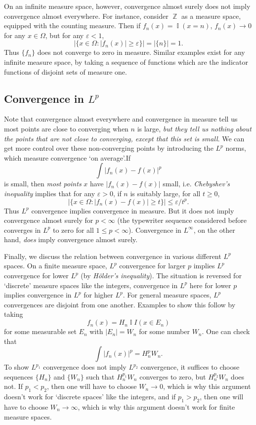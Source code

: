 \documentclass[answers]{exam}
\DeclareMathOperator{\ZZ}{\mathbb{Z}}
\DeclareMathOperator{\II}{\mathbb{I}}
\begin{document}
\begin{questions}
On an infinite measure space, however, convergence almost surely does not imply convergence almost everywhere. For instance, consider $\ZZ$ as a measure space, equipped with the counting measure. Then if $f_n(x) = \II(x = n)$, $f_n(x) \to 0$ for any $x \in \Omega$, but for any $\varepsilon < 1$,
%
\[ \Big| \{ x \in \Omega: |f_n(x)| \geq \varepsilon \} \Big| = | \{ n \} | = 1. \]
%
Thus $\{ f_n \}$ does not converge to zero in measure. Similar examples exist for any infinite measure space, by taking a sequence of functions which are the indicator functions of disjoint sets of measure one.

\subsection*{Convergence in $L^p$}

Note that convergence almost everywhere and convergence in measure tell us most points are close to converging when $n$ is large, \emph{but they tell us nothing about the points that are not close to converging, except that this set is small}. We can get more control over these non-converging points by introducing the $L^p$ norms, which measure convergence `on average'.If
%
\[ \int |f_n(x) - f(x)|^p \]
%
is small, then \emph{most points} $x$ have $|f_n(x) - f(x)|$ small, i.e. \emph{Chebyshev's inequality} implies that for any $\varepsilon > 0$, if $n$ is suitably large, for all $t \geq 0$,
%
\[ \Big| \{ x \in \Omega : |f_n(x) - f(x)| \geq t \} \Big| \leq \varepsilon / t^p. \]
%
Thus $L^p$ convergence implies convergence in measure. But it does not imply convergence almost surely for $p < \infty$ (the typewriter sequence considered before converges in $L^p$ to zero for all $1 \leq p < \infty$). Convergence in $L^\infty$, on the other hand, \emph{does} imply convergence almost surely.

Finally, we discuss the relation between convergence in various different $L^p$ spaces. On a finite measure space, $L^p$ convergence for larger $p$ implies $L^p$ convergence for lower $L^p$ (by \emph{H\"{o}lder's inequality}). The situation is reversed for `discrete' measure spaces like the integers, convergence in $L^p$ here for lower $p$ implies convergence in $L^p$ for higher $L^p$. For general measure spaces, $L^p$ convergences are disjoint from one another. Examples to show this follow by taking
%
\[ f_n(x) = H_n \II{I}(x \in E_n) \]
%
for some measurable set $E_n$ with $|E_n| = W_n$ for some number $W_n$. One can check that
%
\[ \int |f_n(x)|^p = H_n^p W_n. \]
%
To show $L^{p_1}$ convergence does not imply $L^{p_2}$ convergence, it suffices to choose sequences $\{ H_n \}$ and $\{ W_n \}$ such that $H_n^{p_1} W_n$ converges to zero, but $H_n^{p_2} W_n$ does not. If $p_1 < p_2$, then one will have to choose $W_n \to 0$, which is why this argument doesn't work for `discrete spaces' like the integers, and if $p_1 > p_2$, then one will have to choose $W_n \to \infty$, which is why this argument doesn't work for finite measure spaces.


\end{questions}
\end{document}
